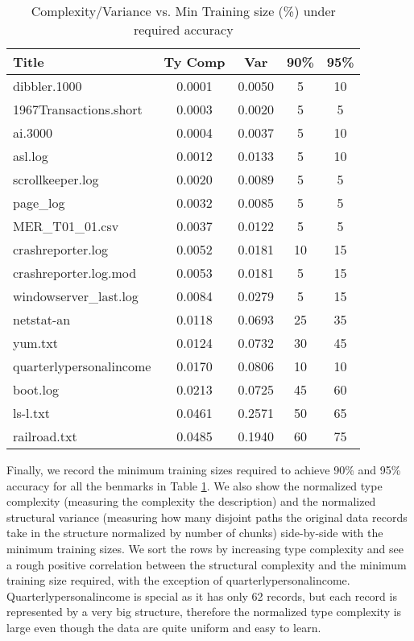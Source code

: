 \begin{table}
\begin{center}
\begin{tabular}{|l|c|c|c|c|} \hline
Title 			& Ty Comp	& Var		& 90\% 		& 95\% \\ \hline \hline
dibbler.1000            & 0.0001	& 0.0050	& 5		& 10 \\ \hline
1967Transactions.short	& 0.0003	& 0.0020	& 5		& 5 \\ \hline
ai.3000                 & 0.0004	& 0.0037	& 5		& 10 \\ \hline
asl.log                 & 0.0012	& 0.0133	& 5		& 10\\ \hline
scrollkeeper.log        & 0.0020	& 0.0089	& 5		& 5\\ \hline
page\_log               & 0.0032	& 0.0085	& 5		& 5\\ \hline
MER\_T01\_01.csv        & 0.0037	& 0.0122	& 5		& 5 \\ \hline
crashreporter.log       & 0.0052	& 0.0181	& 10		& 15\\ \hline
crashreporter.log.mod   & 0.0053	& 0.0181	& 5		& 15\\ \hline
windowserver\_last.log  & 0.0084	& 0.0279	& 5		& 15\\ \hline
netstat-an              & 0.0118	& 0.0693	& 25		& 35\\ \hline
yum.txt                 & 0.0124	& 0.0732	& 30		& 45\\ \hline
quarterlypersonalincome & 0.0170	& 0.0806	& 10		& 10\\ \hline
boot.log                & 0.0213	& 0.0725	& 45		& 60\\ \hline
ls-l.txt                & 0.0461	& 0.2571	& 50		& 65 \\ \hline
railroad.txt            & 0.0485	& 0.1940	& 60		& 75\\ \hline
\end{tabular}
\caption{Complexity/Variance vs. Min Training size (\%) under required accuracy}
\label{tab:correlate}
\end{center}
\end{table}

Finally, we record the minimum training sizes required to achieve 90\% and 95\% accuracy for
all the benmarks in Table \ref{tab:correlate}. We also show the normalized type complexity 
(measuring the complexity the description) and the normalized structural variance (measuring
how many disjoint paths the original data records take in the structure normalized by number of
chunks) side-by-side with the
minimum training sizes. We sort the rows by increasing type complexity and see a rough
positive correlation between the structural complexity and the minimum training size required,
with the exception of quarterlypersonalincome.
Quarterlypersonalincome is special as it has only 62 records, 
but each record is represented by a very big structure, therefore the normalized
type complexity is large even though the data are quite uniform and easy to learn.

